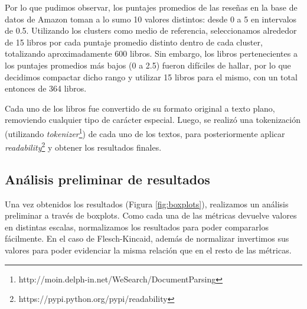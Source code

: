 \documentclass[12pt,journal,compsoc]{IEEEtran}
\begin{document}
Por lo que pudimos observar, los puntajes promedios de las reseñas en la base de datos de Amazon toman a lo sumo 10 valores distintos: desde 0 a 5 en intervalos de 0.5. Utilizando los clusters como medio de referencia, seleccionamos alrededor de 15 libros por cada puntaje promedio distinto dentro de cada cluster, totalizando aproximadamente 600 libros. Sin embargo, los libros pertenecientes a los puntajes promedios más bajos (0 a 2.5) fueron difíciles de hallar, por lo que decidimos compactar dicho rango y utilizar 15 libros para el mismo, con un total entonces de 364 libros.

Cada uno de los libros fue convertido de su formato original a texto plano, removiendo cualquier tipo de carácter especial. Luego, se realizó una tokenización (utilizando \textit{tokenizer}\footnote{http://moin.delph-in.net/WeSearch/DocumentParsing}) de cada uno de los textos, para posteriormente aplicar \textit{readability}\footnote{https://pypi.python.org/pypi/readability} y obtener los resultados finales.

\subsection{Análisis preliminar de resultados}

Una vez obtenidos los resultados (Figura \ref{fig:boxplots}), realizamos un análisis preliminar a través de boxplots. Como cada una de las métricas devuelve valores en distintas escalas, normalizamos los resultados para poder compararlos fácilmente. En el caso de Flesch-Kincaid, además de normalizar invertimos sus valores para poder evidenciar la misma relación que en el resto de las métricas.
\end{document}
